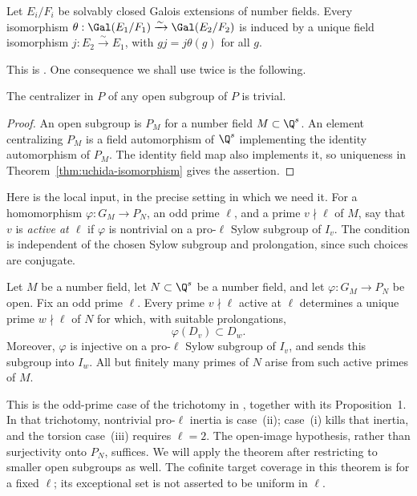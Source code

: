 \begin{theorem}[Uchida]\label{thm:uchida-isomorphism}
Let $E_i/F_i$ be solvably closed Galois extensions of number fields. Every isomorphism
$\theta:\Gal(E_1/F_1)\xrightarrow{\sim}\Gal(E_2/F_2)$
is induced by a unique field isomorphism $j:E_2\xrightarrow{\sim}E_1$, with
$g j=j\theta(g)$ for all $g$.
\end{theorem}
This is \cite[Theorem]{uchida1979}. One consequence we shall use twice is the following.
\begin{lemma}\label{lem:centralizer}
The centralizer in $P$ of any open subgroup of $P$ is trivial.
\end{lemma}
\begin{proof}
An open subgroup is $P_M$ for a number field $M\subset\Q^s$. An element centralizing $P_M$ is a field automorphism of $\Q^s$ implementing the identity automorphism of $P_M$. The identity field map also implements it, so uniqueness in Theorem~\ref{thm:uchida-isomorphism} gives the assertion.
\end{proof}

Here is the local input, in the precise setting in which we need it. For a homomorphism $\varphi:G_M\to P_N$, an odd prime $\ell$, and a prime $v\nmid\ell$ of $M$, say that $v$ is \emph{active at $\ell$} if $\varphi$ is nontrivial on a pro-$\ell$ Sylow subgroup of $I_v$. The condition is independent of the chosen Sylow subgroup and prolongation, since such choices are conjugate.

\begin{theorem}\label{thm:local-correspondence}
Let $M$ be a number field, let $N\subset\Q^s$ be a number field, and let $\varphi:G_M\to P_N$ be open. Fix an odd prime $\ell$. Every prime $v\nmid\ell$ active at $\ell$ determines a unique prime $w\nmid\ell$ of $N$ for which, with suitable prolongations,
\[
 \varphi(D_v)\subset D_w.
\]
Moreover, $\varphi$ is injective on a pro-$\ell$ Sylow subgroup of $I_v$, and sends this subgroup into $I_w$. All but finitely many primes of $N$ arise from such active primes of $M$.
\end{theorem}
This is the odd-prime case of the trichotomy in \cite[\S1, pp.~595--596]{uchida1981}, together with its Proposition~1. In that trichotomy, nontrivial pro-$\ell$ inertia is case~(ii); case~(i) kills that inertia, and the torsion case~(iii) requires $\ell=2$. The open-image hypothesis, rather than surjectivity onto $P_N$, suffices. We will apply the theorem after restricting to smaller open subgroups as well. The cofinite target coverage in this theorem is for a fixed $\ell$; its exceptional set is not asserted to be uniform in $\ell$.

